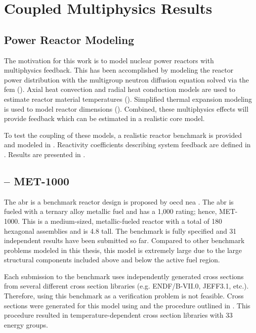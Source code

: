 \chapter{Coupled Multiphysics Results}
\label{ch:coupledResults}

\section{Power Reactor Modeling}
\label{sec:power_reactor_modeling}
  The motivation for this work is to model nuclear power reactors with
  multiphysics feedback. This has been accomplished by modeling the reactor
  power distribution with the multigroup neutron diffusion equation solved via
  the \gls{fem} (). Axial heat convection and radial
  heat conduction models are used to estimate reactor material temperatures
  ().  Simplified thermal expansion modeling is used
  to model reactor dimensions (). Combined, these
  multiphysics effects will provide feedback which can be estimated in a
  realistic core model.
  
  To test the coupling of these models, a realistic reactor benchmark is
  provided and modeled in . Reactivity coefficients describing 
  system feedback are defined in . Results are
  presented in .

\section{ -- MET-1000}
\label{sec:abr}
  The \gls{abr} is a benchmark reactor design is proposed by \gls{oecd}
  \gls{nea} \cite{abr}. The \gls{abr} is fueled with a ternary alloy metallic
  fuel and has a 1,000  rating; hence, MET-1000. This is a
  medium-sized, metallic-fueled reactor with a total of 180 hexagonal assemblies
  and is 4.8  tall.  The benchmark is fully specified and 31
  independent results have been submitted so far. Compared to other benchmark
  problems modeled in this thesis, this model is extremely large due to the
  large structural components included above and below the active fuel region.
  
  Each submission to the benchmark uses independently generated cross sections
  from several different cross section libraries (e.g. ENDF/B-VII.0, JEFF3.1,
  etc.). Therefore, using this benchmark as a verification problem is not
  feasible. Cross sections were generated for this model using \mcc and the 
  procedure outlined in . This procedure
  resulted in temperature-dependent cross section libraries with 33 energy
  groups. 
  
